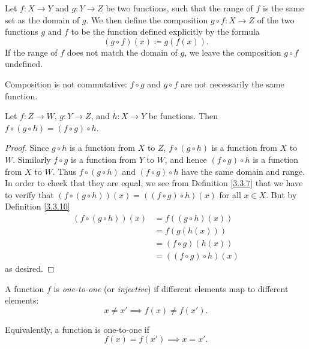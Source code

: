 \setcounter{theorem}{9}
\begin{definition}[Composition]\label{3.3.10}
    Let \(f : X \to Y\) and \(g : Y \to Z\) be two functions, such that the range of \(f\) is the same set as the domain of \(g\).
    We then define the composition \(g \circ f : X \to Z\) of the two functions \(g\) and \(f\) to be the function defined explicitly by the formula
    \[
        (g \circ f)(x) \coloneqq g(f(x)).
    \]
    If the range of \(f\) does not match the domain of \(g\), we leave the composition \(g \circ f\) undefined.
\end{definition}

\begin{note}
    Composition is not commutative: \(f \circ g\) and \(g \circ f\) are not necessarily the same function.
\end{note}

\setcounter{theorem}{11}
\begin{lemma}\label{3.3.12}
    Let \(f : Z \to W\), \(g : Y \to Z\), and \(h : X \to Y\) be functions.
    Then \(f \circ (g \circ h) = (f \circ g) \circ h\).
\end{lemma}

\begin{proof}
    Since \(g \circ h\) is a function from \(X\) to \(Z\), \(f \circ (g \circ h)\) is a function from \(X\) to \(W\).
    Similarly \(f \circ g\) is a function from \(Y\) to \(W\), and hence \((f \circ g) \circ h\) is a function from \(X\) to \(W\).
    Thus \(f \circ (g \circ h)\) and \((f \circ g) \circ h\) have the same domain and range.
    In order to check that they are equal, we see from Definition \ref{3.3.7} that we have to verify that \((f \circ (g \circ h))(x) = ((f \circ g) \circ h)(x)\) for all \(x \in X\).
    But by Definition \ref{3.3.10}
    \begin{align*}
        (f \circ (g \circ h))(x)
         & = f((g \circ h)(x))        \\
         & = f(g(h(x)))               \\
         & = (f \circ g)(h(x))        \\
         & = ((f \circ g) \circ h)(x)
    \end{align*}
    as desired.
\end{proof}

\setcounter{theorem}{13}
\begin{definition}\label{3.3.14}
    A function \(f\) is \emph{one-to-one} (or \emph{injective}) if different elements map to different elements:
    \[
        x \neq x' \implies f(x) \neq f(x').
    \]

    Equivalently, a function is one-to-one if
    \[
        f(x) = f(x') \implies x = x'.
    \]
\end{definition}

